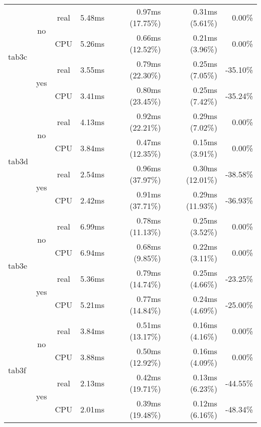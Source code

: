 \documentclass[en]{pracamgr}
\begin{document}
\begin{small}
\begin{longtable}{|l|c|c|r|r|r|r|}
\hline
\multirow{4}{*}{tab3c}    & \multirow{2}{*}{no}  & real & 5.48ms & 0.97ms (17.75\%) & 0.31ms (5.61\%) & 0.00\% \\*
                          &                      & CPU  & 5.26ms & 0.66ms (12.52\%) & 0.21ms (3.96\%) & 0.00\% \\*
                          \cline{2-7}
                          & \multirow{2}{*}{yes} & real & 3.55ms & 0.79ms (22.30\%) & 0.25ms (7.05\%) & -35.10\% \\*
                          &                      & CPU  & 3.41ms & 0.80ms (23.45\%) & 0.25ms (7.42\%) & -35.24\% \\
\hline
\multirow{4}{*}{tab3d}    & \multirow{2}{*}{no}  & real & 4.13ms & 0.92ms (22.21\%) & 0.29ms (7.02\%) & 0.00\% \\*
                          &                      & CPU  & 3.84ms & 0.47ms (12.35\%) & 0.15ms (3.91\%) & 0.00\% \\*
                          \cline{2-7}
                          & \multirow{2}{*}{yes} & real & 2.54ms & 0.96ms (37.97\%) & 0.30ms (12.01\%) & -38.58\% \\*
                          &                      & CPU  & 2.42ms & 0.91ms (37.71\%) & 0.29ms (11.93\%) & -36.93\% \\
\hline
\multirow{4}{*}{tab3e}    & \multirow{2}{*}{no}  & real & 6.99ms & 0.78ms (11.13\%) & 0.25ms (3.52\%) & 0.00\% \\*
                          &                      & CPU  & 6.94ms & 0.68ms (9.85\%) & 0.22ms (3.11\%) & 0.00\% \\*
                          \cline{2-7}
                          & \multirow{2}{*}{yes} & real & 5.36ms & 0.79ms (14.74\%) & 0.25ms (4.66\%) & -23.25\% \\*
                          &                      & CPU  & 5.21ms & 0.77ms (14.84\%) & 0.24ms (4.69\%) & -25.00\% \\
\hline
\multirow{4}{*}{tab3f}    & \multirow{2}{*}{no}  & real & 3.84ms & 0.51ms (13.17\%) & 0.16ms (4.16\%) & 0.00\% \\*
                          &                      & CPU  & 3.88ms & 0.50ms (12.92\%) & 0.16ms (4.09\%) & 0.00\% \\*
                          \cline{2-7}
                          & \multirow{2}{*}{yes} & real & 2.13ms & 0.42ms (19.71\%) & 0.13ms (6.23\%) & -44.55\% \\*
                          &                      & CPU  & 2.01ms & 0.39ms (19.48\%) & 0.12ms (6.16\%) & -48.34\% \\

\end{longtable}
\end{small}
\end{document}
